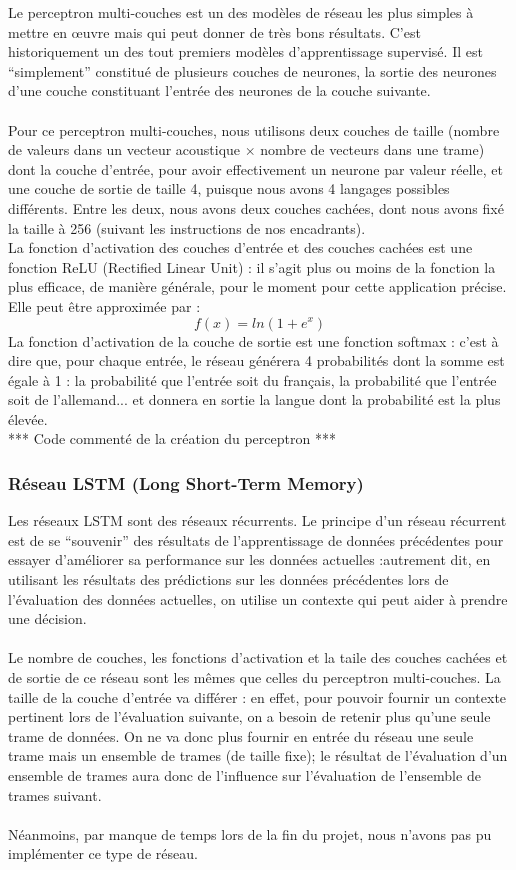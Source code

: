 \documentclass{article}
\begin{document}
Le perceptron multi-couches est un des modèles de réseau les plus simples à mettre en œuvre mais qui peut donner de très bons résultats. C'est historiquement un des tout premiers modèles d'apprentissage supervisé. Il est ``simplement'' constitué de plusieurs couches de neurones, la sortie des neurones d'une couche constituant l'entrée des neurones de la couche suivante.\\
 \\
Pour ce perceptron multi-couches, nous utilisons deux couches de taille (nombre de valeurs dans un vecteur acoustique $\times$ nombre de vecteurs dans une trame) dont la couche d'entrée, pour avoir effectivement un neurone par valeur réelle, et une couche de sortie de taille 4, puisque nous avons 4 langages possibles différents. Entre les deux, nous avons deux couches cachées, dont nous avons fixé la taille à 256 (suivant les instructions de nos encadrants).\\
La fonction d'activation des couches d'entrée et des couches cachées est une fonction ReLU (Rectified Linear Unit) : il s'agit plus ou moins de la fonction la plus efficace, de manière générale, pour le moment pour cette application précise. Elle peut être approximée par :
$$ f(x) = ln(1 + e^{x}) $$
La fonction d'activation de la couche de sortie est une fonction softmax : c'est à dire que, pour chaque entrée, le réseau générera 4 probabilités dont la somme est égale à 1 : la probabilité que l'entrée soit du français, la probabilité que l'entrée soit de l'allemand... et donnera en sortie la langue dont la probabilité est la plus élevée.\\

*** Code commenté de la création du perceptron ***

\subsubsection{Réseau LSTM (Long Short-Term Memory)}

Les réseaux LSTM sont des réseaux récurrents. Le principe d'un réseau récurrent est de se ``souvenir'' des résultats de l'apprentissage de données précédentes pour essayer d'améliorer sa performance sur les données actuelles :autrement dit, en utilisant les résultats des prédictions sur les données précédentes lors de l'évaluation des données actuelles, on utilise un contexte qui peut aider à prendre une décision.\\
 \\
Le nombre de couches, les fonctions d'activation et la taile des couches cachées et de sortie de ce réseau sont les mêmes que celles du perceptron multi-couches. La taille de la couche d'entrée va différer : en effet, pour pouvoir fournir un contexte pertinent lors de l'évaluation suivante, on a besoin de retenir plus qu'une seule trame de données. On ne va donc plus fournir en entrée du réseau une seule trame mais un ensemble de trames (de taille fixe); le résultat de l'évaluation d'un ensemble de trames aura donc de l'influence sur l'évaluation de l'ensemble de trames suivant.\\
 \\
Néanmoins, par manque de temps lors de la fin du projet, nous n'avons pas pu implémenter ce type de réseau.
\end{document}
